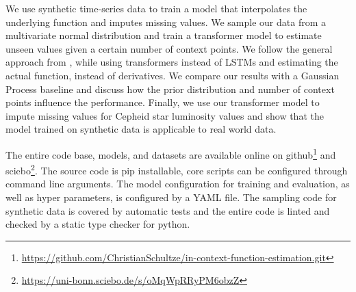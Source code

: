 We use synthetic time-series data to train a model that interpolates the underlying function and imputes missing values. We sample our data from a multivariate normal distribution and train a transformer model to estimate unseen values given a certain number of context points. We follow the general approach from \citet{seifner2025zeroshotimputationfoundationinference}, while using transformers instead of LSTMs and estimating the actual function, instead of derivatives. We compare our results with a Gaussian Process baseline and discuss how the prior distribution and number of context points influence the performance. Finally, we use our transformer model to impute missing values for Cepheid star luminosity values and show that the model trained on synthetic data is applicable to real world data.

The entire code base, models, and datasets are available online on github\footnote{\url{https://github.com/ChristianSchultze/in-context-function-estimation.git}} and sciebo\footnote{\url{https://uni-bonn.sciebo.de/s/oMqWpRRyPM6obzZ}}.
The source code is pip installable, core scripts can be configured through command line arguments. The model configuration for training and evaluation, as well as hyper parameters, is configured by a YAML file. The sampling code for synthetic data is covered by automatic tests and the entire code is linted and checked by a static type checker for python.